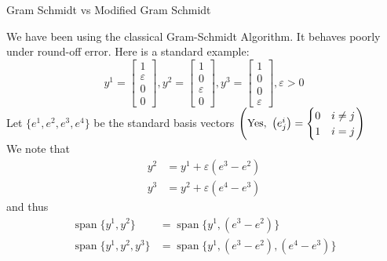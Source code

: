 \documentclass[letterpaper]{article}
\begin{document}
\baselineskip=48pt  %


\setlength{\parskip}{.3in}
\setlength{\itemsep}{.3in}

\pagestyle{plain}

{\Large \bf
\begin{center}
Gram Schmidt vs Modified Gram Schmidt
\end{center}
}

\large

    We have been using the classical Gram-Schmidt Algorithm. It behaves poorly under round-off error. Here is a standard example:
    \begin{equation*}
        y^1=\left[\begin{matrix} 1 \\ \varepsilon \\ 0 \\ 0 \end{matrix}\right],
        y^2=\left[\begin{matrix} 1 \\ 0 \\ \varepsilon \\ 0 \end{matrix}\right],
        y^3=\left[\begin{matrix} 1 \\ 0 \\ 0 \\ \varepsilon \end{matrix}\right],
        \varepsilon>0
    \end{equation*}
    Let $\{e^1,e^2,e^3,e^4\}$ be the standard basis vectors $\left(\textnormal{Yes, }\left(e_j^i\right)=\begin{cases}
        0 & i\neq j\\
        1 & i=j\\
    \end{cases}\right)$\\
    We note that
    \begin{align*}
        y^2 &= y^1+\varepsilon(e^3-e^2)\\
        y^3 &= y^2+\varepsilon(e^4-e^3)
    \end{align*}
    and thus
    \begin{align*}
        \operatorname{span}\{y^1,y^2\}&=\operatorname{span}\{y^1,(e^3-e^2)\}\\
        \operatorname{span}\{y^1,y^2,y^3\}&=\operatorname{span}\{y^1,(e^3-e^2),(e^4-e^3)\}
    \end{align*}
\end{document}
